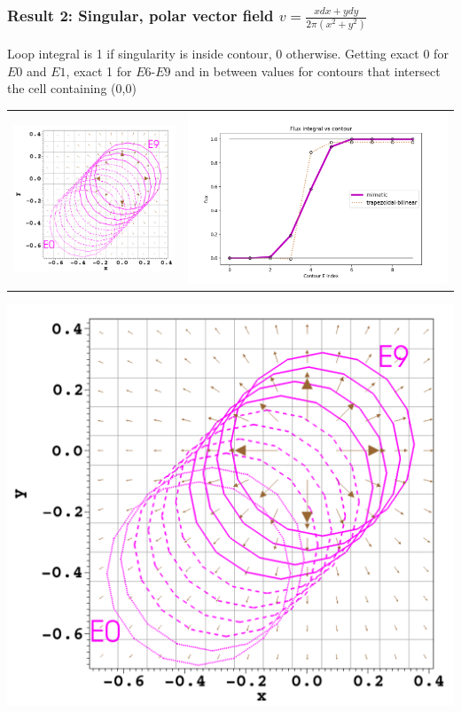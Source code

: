 \documentclass[aspectratio=169]{beamer}
\begin{document}
\begin{frame}[t]
  \frametitle{Result 2: Singular, polar vector field $v = \frac{x dx + y dy}{2 \pi (x^2 + y^2)}$}
  \begin{block}{Loop integral is 1 if singularity is inside contour, 0 otherwise. Getting exact 0 for $E0$ and $E1$, exact 1 for $E6$-$E9$ and in between values for contours that intersect the cell containing (0,0)}
  \end{block}
  \begin{tabular}{lr}
  \includegraphics[width=50mm]{polar.png} & 
  \includegraphics[width=80mm]{polarFluxes.png}
  \end{tabular}



  \begin{center}
    \includegraphics[width=.5\linewidth]{polar.png}
  \end{center}
\end{frame}
\end{document}
